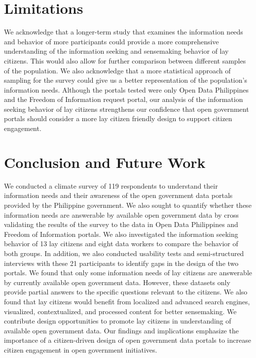 \documentclass{sigchi}
\begin{document}
\section{Limitations}
We acknowledge that a longer-term study that examines the information needs and behavior of more participants could provide a more comprehensive understanding of the information seeking and sensemaking behavior of lay citizens. This would also allow for further comparison between different samples of the population. We also acknowledge that a more statistical approach of sampling for the survey could give us a better representation of the population's information needs. Although the portals tested were only Open Data Philippines and the Freedom of Information request portal, our analysis of the information seeking behavior of lay citizens strengthens our confidence that open government portals should consider a more lay citizen friendly design to support citizen engagement.

\section{Conclusion and Future Work}
We conducted a climate survey of 119 respondents to understand their information needs and their awareness of the open government data portals provided by the Philippine government. We also sought to quantify whether these information needs are answerable by available open government data by cross validating the results of the survey to the data in Open Data Philippines and Freedom of Information portals. We also investigated the information seeking behavior of 13 lay citizens and eight data workers to compare the behavior of both groups. In addition, we also conducted usability tests and semi-structured interviews with these 21 participants to identify gaps in the design of the two portals. We found that only some information needs of lay citizens are answerable by currently available open government data. However, these datasets only provide partial answers to the specific questions relevant to the citizens. We also found that lay citizens would benefit from localized and advanced search engines, visualized, contextualized, and processed content for better sensemaking. We contribute design opportunities to promote lay citizens in understanding of available open government data. Our findings and implications emphasize the importance of a citizen-driven design of open government data portals to increase citizen engagement in open government initiatives.
\end{document}
